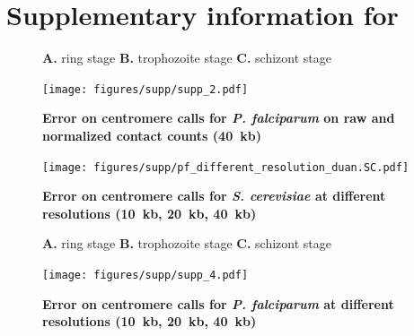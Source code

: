 \chapter[Supplementaries for \citet{varoquaux:accurate}]{Supplementary information for
\citet{varoquaux:accurate}}
\label{chap:centurion_supp}

\graphicspath{{9_centurion_supplementaries/}}


\begin{figure}[ht!]
\caption{\textbf{Error on centromere calls for \textit{P. falciparum} on raw
and normalized contact counts (40~kb)}}{
\textbf{A.} ring stage \textbf{B.}
trophozoite stage \textbf{C.} schizont stage}
\begin{center}
\texttt{[image: figures/supp/supp\_2.pdf]}
\end{center}
\label{suppfig:raw_vs_normed_pf}
\end{figure}

\clearpage

\begin{figure}[ht!]
\caption{\textbf{Error on centromere calls for \textit{S. cerevisiae}
at different resolutions (10~kb, 20~kb, 40~kb)}}
\begin{center}
\texttt{[image: figures/supp/pf\_different\_resolution\_duan.SC.pdf]}
\end{center}
\label{suppfig:error_diff_res_sc}
\end{figure}


\begin{figure}[ht!]
\caption{\textbf{Error on centromere calls for \textit{P. falciparum}
at different resolutions (10~kb, 20~kb, 40~kb)}}
{\textbf{A.} ring stage \textbf{B.} trophozoite stage \textbf{C.} schizont stage}
\begin{center}
\texttt{[image: figures/supp/supp\_4.pdf]}
\end{center}
\label{suppfig:error_diff_res_pf}
\end{figure}

\clearpage

